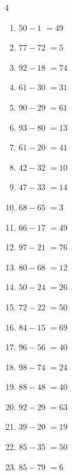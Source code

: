 \begin{multicols}{4}
\begin{enumerate}
  \item $50-1$
        $=49$

  \item $77-72$
        $=5$

  \item $92-18$
        $=74$

  \item $61-30$
        $=31$

  \item $90-29$
        $=61$

  \item $93-80$
        $=13$

  \item $61-20$
        $=41$

  \item $42-32$
        $=10$

  \item $47-33$
        $=14$

  \item $68-65$
        $=3$

  \item $66-17$
        $=49$

  \item $97-21$
        $=76$

  \item $80-68$
        $=12$

  \item $50-24$
        $=26$

\columnbreak %

  \item $72-22$
        $=50$

  \item $84-15$
        $=69$

  \item $96-56$
        $=40$

  \item $98-74$
        $=24$

  \item $88-48$
        $=40$

  \item $92-29$
        $=63$

  \item $39-20$
        $=19$

  \item $85-35$
        $=50$

  \item $85-79$
        $=6$


\end{enumerate}
\end{multicols}
